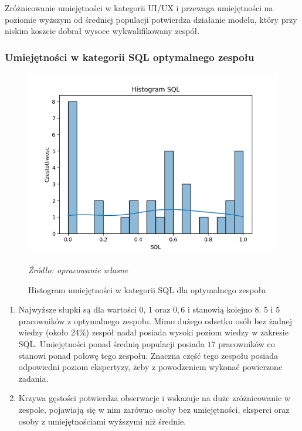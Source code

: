         \par Zróżnicowanie umiejętności w kategorii UI/UX i przewaga umiejętności na poziomie wyższym od średniej populacji potwierdza działanie modelu, który przy niskim koszcie dobrał wysoce wykwalifikowany zespół.
        
        \subsubsection{Umiejętności w kategorii SQL optymalnego zespołu}
        \begin{figure}[H]
            \centering
            \includegraphics[width=\linewidth]{chapters/Images/hist_sql_optimal.png}
            \cprotect\caption{Histogram umiejętności w kategorii SQL dla optymalnego zespołu}
            \textit{Źródło: opracowanie własne} 
            \label{fig:hist_sql_optimal}
        \end{figure}

        \begin{enumerate}
            \item Najwyższe słupki są dla wartości $0$, $1$ oraz $0,6$ i stanowią kolejno $8$. $5$ i $5$ pracowników z optymalnego zespołu. Mimo dużego odsetku osób bez żadnej wiedzy (około $24\%$) zespół nadal posiada wysoki poziom wiedzy w zakresie SQL. Umiejętności ponad średnią populacji posiada $17$ pracowników co stanowi ponad połowę tego zespołu. Znaczna część tego zespołu posiada odpowiedni poziom ekspertyzy, żeby z powodzeniem wykonać powierzone zadania.
            \item Krzywa gęstości potwierdza obserwacje i wskazuje na duże zróżnicowanie w zespole, pojawiają się w nim zarówno osoby bez umiejętności, eksperci oraz osoby z umiejętnościami wyższymi niż średnie.
        \end{enumerate}

